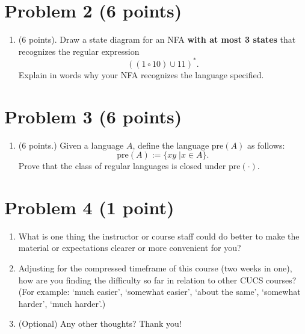 \documentclass[letterpaper,11pt,twoside]{article}
\theoremstyle{plain}
\theoremstyle{definition}
\theoremstyle{remark}
\theoremstyle{restate}
\newcommand{\blue}[1]{{{\color{blue}#1}}}
\newcommand{\blue}[1]{{{#1}}}
\begin{document}
\clearpage
\section{Problem 2 (6 points)}

\begin{enumerate}
    \item (6 points). Draw a state diagram for an NFA \textbf{with at most 3 states} that recognizes the regular expression
        \[
            ((1 \circ 10) \cup 11)^*.
        \]
        Explain in words why your NFA recognizes the language specified.
\end{enumerate}

\clearpage
\section{Problem 3 (6 points)}
    \begin{enumerate}
        \item (6 points.) Given a language $A$, define the language pre$(A)$ as follows:
        \[
            \text{pre}(A) := \{xy \; | x \in A\}.
        \]
        Prove that the class of regular languages is closed under pre$(\cdot)$.
    \end{enumerate}

\clearpage
\section{Problem 4 (1 point)}
    \begin{enumerate}
        \item What is one thing the instructor or course staff could do better to make the material or expectations clearer or more convenient for you?
        
        
        \item Adjusting for the compressed timeframe of this course (two weeks in one), how are you finding the difficulty so far in relation to other CUCS courses? (For example: `much easier', `somewhat easier', `about the same', `somewhat harder', `much harder'.) 
        
        
        \item (Optional) Any other thoughts? Thank you!
    \end{enumerate}
\end{document}
